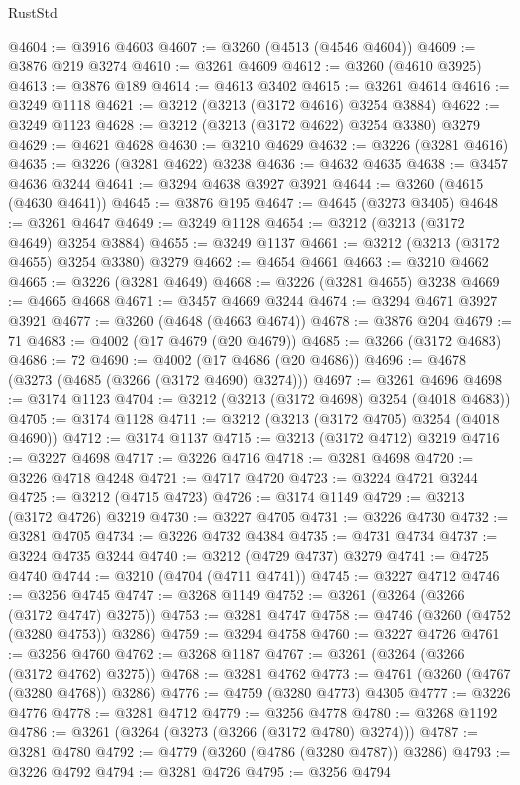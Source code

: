 \begin{lexlean}{RustStd}
\begin{coremodule}
{\begin{coremodule}
{{{{{{{{{{{{{{{{{{{{{{{{{{@4604 := @3916 @4603
@4607 := @3260 (@4513 (@4546 @4604))
@4609 := @3876 @219 @3274
@4610 := @3261 @4609
@4612 := @3260 (@4610 @3925)
@4613 := @3876 @189
@4614 := @4613 @3402
@4615 := @3261 @4614
@4616 := @3249 @1118
@4621 := @3212 (@3213 (@3172 @4616) @3254 @3884)
@4622 := @3249 @1123
@4628 := @3212 (@3213 (@3172 @4622) @3254 @3380) @3279
@4629 := @4621 @4628
@4630 := @3210 @4629
@4632 := @3226 (@3281 @4616)
@4635 := @3226 (@3281 @4622) @3238
@4636 := @4632 @4635
@4638 := @3457 @4636 @3244
@4641 := @3294 @4638 @3927 @3921
@4644 := @3260 (@4615 (@4630 @4641))
@4645 := @3876 @195
@4647 := @4645 (@3273 @3405)
@4648 := @3261 @4647
@4649 := @3249 @1128
@4654 := @3212 (@3213 (@3172 @4649) @3254 @3884)
@4655 := @3249 @1137
@4661 := @3212 (@3213 (@3172 @4655) @3254 @3380) @3279
@4662 := @4654 @4661
@4663 := @3210 @4662
@4665 := @3226 (@3281 @4649)
@4668 := @3226 (@3281 @4655) @3238
@4669 := @4665 @4668
@4671 := @3457 @4669 @3244
@4674 := @3294 @4671 @3927 @3921
@4677 := @3260 (@4648 (@4663 @4674))
@4678 := @3876 @204
@4679 := 71
@4683 := @4002 (@17 @4679 (@20 @4679))
@4685 := @3266 (@3172 @4683)
@4686 := 72
@4690 := @4002 (@17 @4686 (@20 @4686))
@4696 := @4678 (@3273 (@4685 (@3266 (@3172 @4690) @3274)))
@4697 := @3261 @4696
@4698 := @3174 @1123
@4704 := @3212 (@3213 (@3172 @4698) @3254 (@4018 @4683))
@4705 := @3174 @1128
@4711 := @3212 (@3213 (@3172 @4705) @3254 (@4018 @4690))
@4712 := @3174 @1137
@4715 := @3213 (@3172 @4712) @3219
@4716 := @3227 @4698
@4717 := @3226 @4716
@4718 := @3281 @4698
@4720 := @3226 @4718 @4248
@4721 := @4717 @4720
@4723 := @3224 @4721 @3244
@4725 := @3212 (@4715 @4723)
@4726 := @3174 @1149
@4729 := @3213 (@3172 @4726) @3219
@4730 := @3227 @4705
@4731 := @3226 @4730
@4732 := @3281 @4705
@4734 := @3226 @4732 @4384
@4735 := @4731 @4734
@4737 := @3224 @4735 @3244
@4740 := @3212 (@4729 @4737) @3279
@4741 := @4725 @4740
@4744 := @3210 (@4704 (@4711 @4741))
@4745 := @3227 @4712
@4746 := @3256 @4745
@4747 := @3268 @1149
@4752 := @3261 (@3264 (@3266 (@3172 @4747) @3275))
@4753 := @3281 @4747
@4758 := @4746 (@3260 (@4752 (@3280 @4753)) @3286)
@4759 := @3294 @4758
@4760 := @3227 @4726
@4761 := @3256 @4760
@4762 := @3268 @1187
@4767 := @3261 (@3264 (@3266 (@3172 @4762) @3275))
@4768 := @3281 @4762
@4773 := @4761 (@3260 (@4767 (@3280 @4768)) @3286)
@4776 := @4759 (@3280 @4773) @4305
@4777 := @3226 @4776
@4778 := @3281 @4712
@4779 := @3256 @4778
@4780 := @3268 @1192
@4786 := @3261 (@3264 (@3273 (@3266 (@3172 @4780) @3274)))
@4787 := @3281 @4780
@4792 := @4779 (@3260 (@4786 (@3280 @4787)) @3286)
@4793 := @3226 @4792
@4794 := @3281 @4726
@4795 := @3256 @4794
}}}}}}}}}}}}}}}}}}}}}}}}}}
\end{coremodule}}
\end{coremodule}
\end{lexlean}
